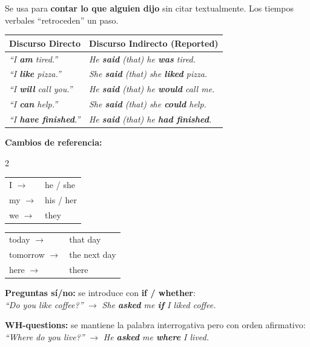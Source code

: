 \documentclass[12pt,a4paper]{article}
\begin{document}
\begin{cajagrammar}
Se usa para \textbf{contar lo que alguien dijo} sin citar textualmente. Los tiempos verbales ``retroceden'' un paso.

\medskip
\begin{tabularx}{\textwidth}{@{} l l @{}}
\toprule
\textbf{Discurso Directo} & \textbf{Discurso Indirecto (Reported)} \\
\midrule
\textit{``I \textbf{am} tired.''} & \textit{He \textbf{said} (that) he \textbf{was} tired.} \\
\textit{``I \textbf{like} pizza.''} & \textit{She \textbf{said} (that) she \textbf{liked} pizza.} \\
\textit{``I \textbf{will} call you.''} & \textit{He \textbf{said} (that) he \textbf{would} call me.} \\
\textit{``I \textbf{can} help.''} & \textit{She \textbf{said} (that) she \textbf{could} help.} \\
\textit{``I \textbf{have finished}.''} & \textit{He \textbf{said} (that) he \textbf{had finished}.} \\
\bottomrule
\end{tabularx}

\medskip
\textbf{Cambios de referencia:}
\begin{multicols}{2}
\begin{tabularx}{\linewidth}{@{} l l @{}}
I $\rightarrow$ & he / she \\
my $\rightarrow$ & his / her \\
we $\rightarrow$ & they \\
\end{tabularx}

\columnbreak

\begin{tabularx}{\linewidth}{@{} l l @{}}
today $\rightarrow$ & that day \\
tomorrow $\rightarrow$ & the next day \\
here $\rightarrow$ & there \\
\end{tabularx}
\end{multicols}

\medskip
\begin{cajaejemplo}
\textbf{Preguntas sí/no:} se introduce con \textbf{if / whether}:\\
\textit{``Do you like coffee?''} $\rightarrow$ \textit{She \textbf{asked} me \textbf{if} I liked coffee.}

\medskip
\textbf{WH-questions:} se mantiene la palabra interrogativa pero con orden afirmativo:\\
\textit{``Where do you live?''} $\rightarrow$ \textit{He \textbf{asked} me \textbf{where} I lived.}
\end{cajaejemplo}
\end{cajagrammar}
\end{document}
